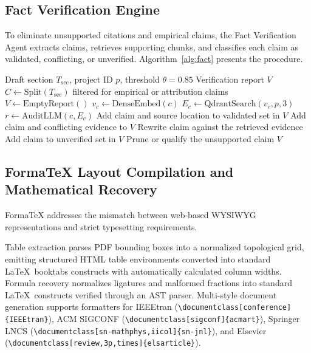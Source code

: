 \documentclass[conference]{IEEEtran}
\begin{document}
\subsection{Fact Verification Engine}
To eliminate unsupported citations and empirical claims, the Fact Verification Agent extracts claims, retrieves supporting chunks, and classifies each claim as validated, conflicting, or unverified. Algorithm~\ref{alg:fact} presents the procedure.

\begin{algorithm}[!t]
\caption{Real-Time Claim Extraction and Multi-Hop Grounding}
\label{alg:fact}
\begin{algorithmic}[1]
\Require Draft section $T_{\mathrm{sec}}$, project ID $p$, threshold $\theta=0.85$
\Ensure Verification report $V$
\State $C \gets \mathrm{Split}(T_{\mathrm{sec}})$ filtered for empirical or attribution claims
\State $V \gets \mathrm{EmptyReport}()$
  \State $v_c \gets \mathrm{DenseEmbed}(c)$
  \State $E_c \gets \mathrm{QdrantSearch}(v_c, p, 3)$
  \State $r \gets \mathrm{AuditLLM}(c, E_c)$
    \State Add claim and source location to validated set in $V$
    \State Add claim and conflicting evidence to $V$
    \State Rewrite claim against the retrieved evidence
  \Else
    \State Add claim to unverified set in $V$
    \State Prune or qualify the unsupported claim
  \EndIf
\EndFor
\State \Return $V$
\end{algorithmic}
\end{algorithm}

\subsection{FormaTeX Layout Compilation and Mathematical Recovery}
FormaTeX addresses the mismatch between web-based WYSIWYG representations and strict typesetting requirements.

Table extraction parses PDF bounding boxes into a normalized topological grid, emitting structured HTML table environments converted into standard \LaTeX\ booktabs constructs with automatically calculated column widths. Formula recovery normalizes ligatures and malformed fractions into standard \LaTeX\ constructs verified through an AST parser. Multi-style document generation supports formatters for IEEEtran (\verb|\documentclass[conference]{IEEEtran}|), ACM SIGCONF (\verb|\documentclass[sigconf]{acmart}|), Springer LNCS (\verb|\documentclass[sn-mathphys,iicol]{sn-jnl}|), and Elsevier (\verb|\documentclass[review,3p,times]{elsarticle}|).
\end{document}
